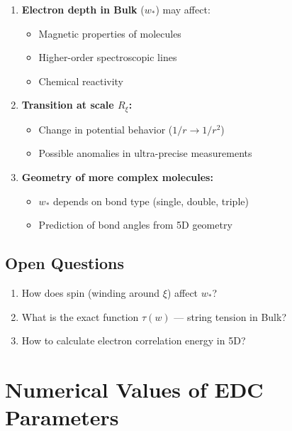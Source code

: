 \documentclass[12pt,a4paper]{article}
\begin{document}
\begin{enumerate}
    \item \textbf{Electron depth in Bulk} ($w_*$) may affect:
    \begin{itemize}
        \item Magnetic properties of molecules
        \item Higher-order spectroscopic lines
        \item Chemical reactivity
    \end{itemize}
    
    \item \textbf{Transition at scale $R_\xi$:}
    \begin{itemize}
        \item Change in potential behavior ($1/r \to 1/r^2$)
        \item Possible anomalies in ultra-precise measurements
    \end{itemize}
    
    \item \textbf{Geometry of more complex molecules:}
    \begin{itemize}
        \item $w_*$ depends on bond type (single, double, triple)
        \item Prediction of bond angles from 5D geometry
    \end{itemize}
\end{enumerate}

\subsection{Open Questions}

\begin{enumerate}
    \item How does spin (winding around $\xi$) affect $w_*$?
    \item What is the exact function $\tau(w)$ --- string tension in Bulk?
    \item How to calculate electron correlation energy in 5D?
\end{enumerate}

\appendix

\section{Numerical Values of EDC Parameters}
\end{document}
